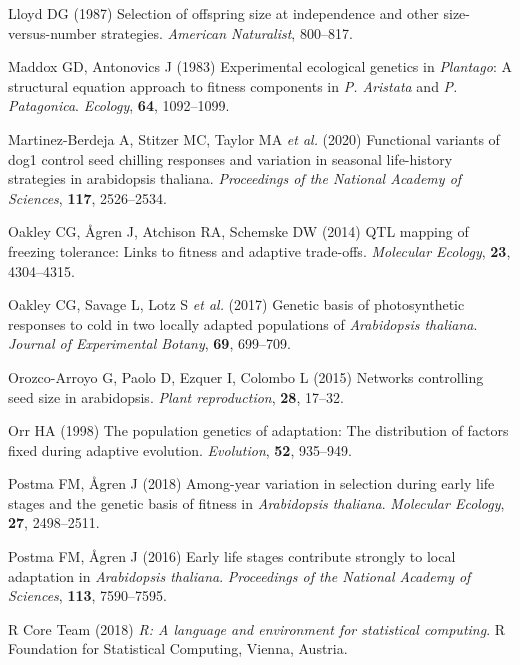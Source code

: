 \documentclass[
]{article}
\begin{document}
\leavevmode\hypertarget{ref-Lloyd1987}{}%
Lloyd DG (1987) Selection of offspring size at independence and other size-versus-number strategies. \emph{American Naturalist}, 800--817.

\leavevmode\hypertarget{ref-Maddox1983}{}%
Maddox GD, Antonovics J (1983) Experimental ecological genetics in \emph{Plantago}: A structural equation approach to fitness components in \emph{P. Aristata} and \emph{P. Patagonica}. \emph{Ecology}, \textbf{64}, 1092--1099.

\leavevmode\hypertarget{ref-martinez2020functional}{}%
Martinez-Berdeja A, Stitzer MC, Taylor MA \emph{et al.} (2020) Functional variants of dog1 control seed chilling responses and variation in seasonal life-history strategies in arabidopsis thaliana. \emph{Proceedings of the National Academy of Sciences}, \textbf{117}, 2526--2534.

\leavevmode\hypertarget{ref-oakley2014qtl}{}%
Oakley CG, Ågren J, Atchison RA, Schemske DW (2014) QTL mapping of freezing tolerance: Links to fitness and adaptive trade-offs. \emph{Molecular Ecology}, \textbf{23}, 4304--4315.

\leavevmode\hypertarget{ref-oakley2017genetic}{}%
Oakley CG, Savage L, Lotz S \emph{et al.} (2017) Genetic basis of photosynthetic responses to cold in two locally adapted populations of \emph{Arabidopsis thaliana}. \emph{Journal of Experimental Botany}, \textbf{69}, 699--709.

\leavevmode\hypertarget{ref-orozco2015networks}{}%
Orozco-Arroyo G, Paolo D, Ezquer I, Colombo L (2015) Networks controlling seed size in arabidopsis. \emph{Plant reproduction}, \textbf{28}, 17--32.

\leavevmode\hypertarget{ref-orr1998population}{}%
Orr HA (1998) The population genetics of adaptation: The distribution of factors fixed during adaptive evolution. \emph{Evolution}, \textbf{52}, 935--949.

\leavevmode\hypertarget{ref-postma2018among}{}%
Postma FM, Ågren J (2018) Among-year variation in selection during early life stages and the genetic basis of fitness in \emph{Arabidopsis thaliana}. \emph{Molecular Ecology}, \textbf{27}, 2498--2511.

\leavevmode\hypertarget{ref-postma_early_2016}{}%
Postma FM, Ågren J (2016) Early life stages contribute strongly to local adaptation in \emph{Arabidopsis thaliana}. \emph{Proceedings of the National Academy of Sciences}, \textbf{113}, 7590--7595.

\leavevmode\hypertarget{ref-RCT2015}{}%
R Core Team (2018) \emph{R: A language and environment for statistical computing}. R Foundation for Statistical Computing, Vienna, Austria.
\end{document}
